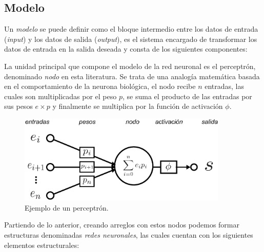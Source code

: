 \subsection{Modelo}
Un \emph{modelo} se puede definir como el bloque intermedio entre los datos de entrada (\emph{input}) y los datos de salida (\emph{output}), es el sistema encargado de transformar los datos de entrada en la salida deseada y consta de los siguientes componentes:

La unidad principal que compone el modelo de la red neuronal es el perceptrón, denominado \emph{nodo} en esta literatura. Se trata de una analogía matemática basada en el comportamiento de la neurona biológica, el nodo recibe $n$ entradas, las cuales son multiplicadas por el peso $p$, se suma el producto de las entradas por sus pesos $ e \times p$ y finalmente se multiplica por la función de activación $\phi$. 

\begin{figure}[h!]
    \includegraphics[width=100mm]{Figuras/neural_network.eps}
    \centering
    \caption{Ejemplo de un perceptrón.}
    \label{fig:percep}
\end{figure}

Partiendo de lo anterior, creando arreglos con estos nodos podemos formar estructuras denominadas \emph{redes neuronales}, las cuales cuentan con los siguientes elementos estructurales:

